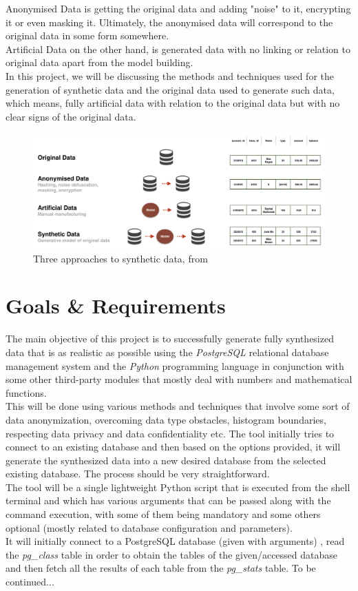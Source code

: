 Anonymised Data is getting the original data and adding "noise" to it, encrypting it or even masking it. Ultimately, the anonymised data will correspond to the original data in some form somewhere.\\
Artificial Data on the other hand, is generated data with no linking or relation to original data apart from the model building.\\
\newline
In this project, we will be discussing the methods and techniques used for the generation of synthetic data and the original data used to generate such data, which means, fully artificial data with relation to the original data but with no clear signs of the original data.
\begin{figure}[H]
	\includegraphics[width=\linewidth]{./Figures/Synthetic_Data/types_of_data_comparison.png}
	\caption{Three approaches to synthetic data, from \citeauthor{Synthesized_2018}}
\end{figure}
\section{Goals \& Requirements}
The main objective of this project is to successfully generate fully synthesized data that is as realistic as possible using the \textit{PostgreSQL} relational database management system and the \textit{Python} programming language in conjunction with some other third-party modules that mostly deal with numbers and mathematical functions.\\
\newline
This will be done using various methods and techniques that involve some sort of data anonymization, overcoming data type obstacles, histogram boundaries, respecting data privacy and data confidentiality etc. The tool initially tries to connect to an existing database and then based on the options provided, it will generate the synthesized data into a new desired database from the selected existing database. The process should be very straightforward.\\
\newline
The tool will be a single lightweight Python script that is executed from the shell terminal and which has various arguments that can be passed along with the command execution, with some of them being mandatory and some others optional (mostly related to database configuration and parameters).\\
It will initially connect to a PostgreSQL database (given with arguments) , read the \textit{pg\_class} table in order to obtain the tables of the given/accessed database and then fetch all the results of each table from the \textit{pg\_stats} table. 
To be continued...
